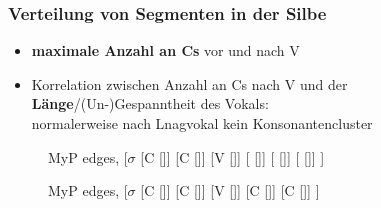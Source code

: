 \begin{frame}
\frametitle{Verteilung von Segmenten in der Silbe}


\begin{minipage}{.59\textwidth}
	\begin{itemize}
	\item \textbf{maximale Anzahl an Cs} vor und nach V
	
	
	\item Korrelation zwischen Anzahl an Cs nach V und der \textbf{Länge}/(Un-)Gespanntheit des
          Vokals:\\
              normalerweise nach Lnagvokal kein Konsonantencluster
	\end{itemize}
\end{minipage}
%
\begin{minipage}{.4\textwidth}

\begin{figure}
	\small
	\centering
	\begin{forest}
	MyP edges,
	[$\sigma$
	[C []]
	[C []]
	[V []]	
	[ []]
	[ []]
	[ []]
	]
	\end{forest}
	
	\begin{forest}
	MyP edges,
	[$\sigma$
	[C []]
	[C [\textipa{\textscr }]]
	[V []]
	[C []]
	[C []]	
	]
	\end{forest}

\end{figure}

\end{minipage}


\end{frame}



